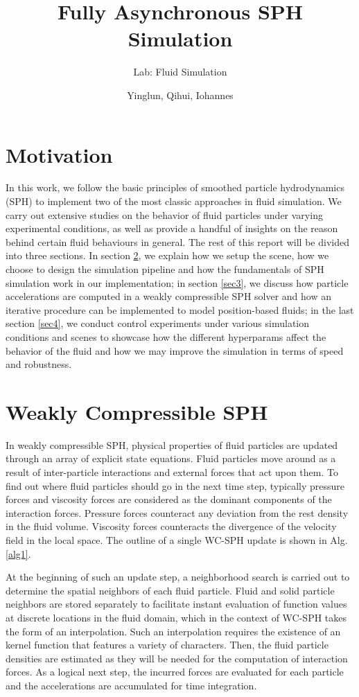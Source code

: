 \documentclass[
	11pt, 
	DIV10,
	ngerman,
	a4paper, 
	oneside, 
	headings=normal, 
	captions=tableheading,
	final, 
	numbers=noenddot
]{scrartcl}
\title{Fully Asynchronous SPH Simulation}
\subtitle{\vspace{0.5cm}Lab: Fluid Simulation}
\author{Yinglun, Qihui, Iohannes}
\begin{document}
\maketitle


\section{Motivation}

In this work, we follow the basic principles of smoothed particle hydrodynamics (SPH) to implement two of the most classic approaches in fluid simulation. We carry out extensive studies on the behavior of fluid particles under varying experimental conditions, as well as provide a handful of insights on the reason behind certain fluid behaviours in general. The rest of this report will be divided into three sections. In section \ref{sec2}, we explain how we setup the scene, how we choose to design the simulation pipeline and how the fundamentals of SPH simulation work in our implementation; in section \ref{sec3}, we discuss how particle accelerations are computed in a weakly compressible SPH solver and how an iterative procedure can be implemented to model position-based fluids; in the last section \ref{sec4}, we conduct control experiments under various simulation conditions and scenes to showcase how the different hyperparams affect the behavior of the fluid and how we may improve the simulation in terms of speed and robustness.

\section{Weakly Compressible SPH}
\label{sec2}

In weakly compressible SPH, physical properties of fluid particles are updated through an array of explicit state equations. Fluid particles move around as a result of inter-particle interactions and external forces that act upon them. To find out where fluid particles should go in the next time step, typically pressure forces and viscosity forces are considered as the dominant components of the interaction forces. Pressure forces counteract any deviation from the rest density in the fluid volume. Viscosity forces counteracts the divergence of the velocity field in the local space. The outline of a single WC-SPH update is shown in Alg. \ref{alg1}.

At the beginning of such an update step, a neighborhood search is carried out to determine the spatial neighbors of each fluid particle. Fluid and solid particle neighbors are stored separately to facilitate instant evaluation of function values at discrete locations in the fluid domain, which in the context of WC-SPH takes the form of an interpolation. Such an interpolation requires the existence of an kernel function that features a variety of characters. Then, the fluid particle densities are estimated as they will be needed for the computation of interaction forces. As a logical next step, the incurred forces are evaluated for each particle and the accelerations are accumulated for time integration.
\end{document}
